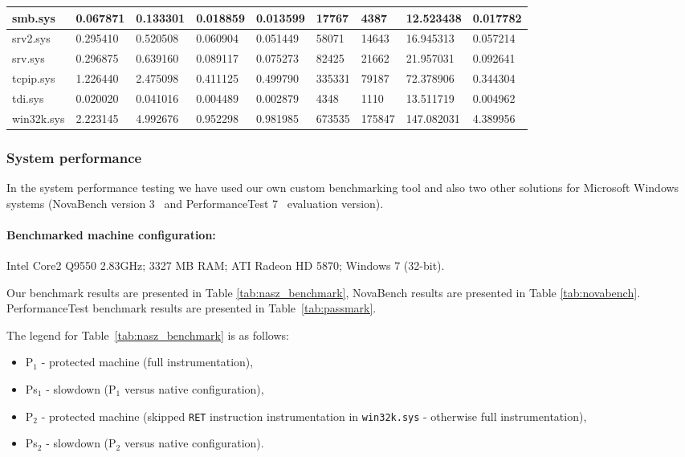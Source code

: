 \documentclass[10pt,twocolumn,a4paper]{article}
\begin{document}
\begin{table*}[!ht]
\begin{tabular}{|p{1.75cm}|p{1.3cm}|p{1.3cm}|p{1.4cm}|p{1.45cm}|p{1.60cm}|p{1.55cm}|p{1.7cm}|p{1.35cm}|}
    smb.sys & 0.067871 & 0.133301 & 0.018859 & 0.013599 & 17767 & 4387  & 12.523438  & 0.017782 \\
    \hline
    srv2.sys & 0.295410 & 0.520508 & 0.060904 & 0.051449 & 58071 & 14643 & 16.945313 & 0.057214 \\
    \hline
    srv.sys & 0.296875 & 0.639160 & 0.089117  & 0.075273 & 82425 & 21662 & 21.957031  & 0.092641 \\
    \hline
    tcpip.sys & 1.226440  & 2.475098 & 0.411125 & 0.499790 & 335331 & 79187 & 72.378906 & 0.344304 \\
    \hline
    tdi.sys & 0.020020 & 0.041016 & 0.004489 & 0.002879 & 4348  & 1110  & 13.511719 & 0.004962 \\
    \hline
    win32k.sys & 2.223145 & 4.992676 & 0.952298 & 0.981985 & 673535 & 175847 & 147.082031 & 4.389956 \\
    \bottomrule
    \end{tabular}\label{tab:tabela_int}\end{table*}

\subsubsection{System performance}


In the system performance testing we have used our own custom benchmarking tool and also two other solutions for Microsoft Windows systems (NovaBench version 3~\cite{BenchmarkNova} and PerformanceTest 7~ \cite{BenchmarkPassmark} evaluation version).

\paragraph{Benchmarked machine configuration:}Intel Core2 Q9550 2.83GHz; 3327 MB RAM; ATI Radeon HD 5870; Windows 7 (32-bit).\newline

Our benchmark results are presented in Table \ref{tab:nasz_benchmark}, NovaBench results are presented in Table \ref{tab:novabench}. PerformanceTest benchmark results are presented in Table~\ref{tab:passmark}.\newline

The legend for Table~\ref{tab:nasz_benchmark} is as follows:
\begin{itemize}
    \item P$_{1}$ - protected machine (full instrumentation),
    \item Ps$_{1}$ - slowdown (P$_{1}$ versus native configuration),
    \item P$_{2}$ - protected machine (skipped {\tt{RET}} instruction instrumentation in {\tt{win32k.sys}} - otherwise full instrumentation),
    \item Ps$_{2}$ - slowdown (P$_{2}$ versus native configuration).
\end{itemize}
\end{document}
